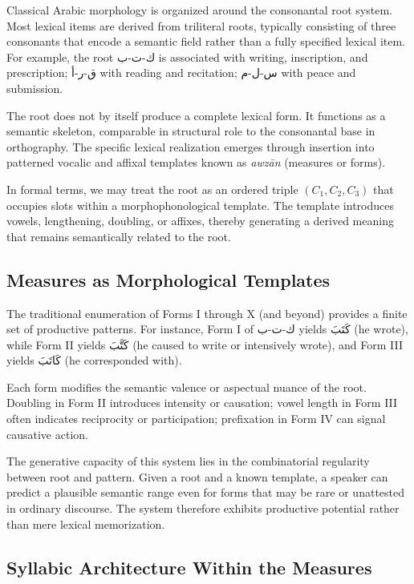 \documentclass[11pt]{article}
\begin{document}
Classical Arabic morphology is organized around the consonantal root system. Most lexical items are derived from triliteral roots, typically consisting of three consonants that encode a semantic field rather than a fully specified lexical item. For example, the root \textarabic{ك-ت-ب} is associated with writing, inscription, and prescription; \textarabic{ق-ر-أ} with reading and recitation; \textarabic{س-ل-م} with peace and submission.

The root does not by itself produce a complete lexical form. It functions as a semantic skeleton, comparable in structural role to the consonantal base in orthography. The specific lexical realization emerges through insertion into patterned vocalic and affixal templates known as \textit{awzān} (measures or forms).

In formal terms, we may treat the root as an ordered triple $(C_1, C_2, C_3)$ that occupies slots within a morphophonological template. The template introduces vowels, lengthening, doubling, or affixes, thereby generating a derived meaning that remains semantically related to the root.

\subsection{Measures as Morphological Templates}

The traditional enumeration of Forms I through X (and beyond) provides a finite set of productive patterns. For instance, Form I of \textarabic{ك-ت-ب} yields \textarabic{كَتَبَ} (he wrote), while Form II yields \textarabic{كَتَّبَ} (he caused to write or intensively wrote), and Form III yields \textarabic{كَاتَبَ} (he corresponded with).

Each form modifies the semantic valence or aspectual nuance of the root. Doubling in Form II introduces intensity or causation; vowel length in Form III often indicates reciprocity or participation; prefixation in Form IV can signal causative action.

The generative capacity of this system lies in the combinatorial regularity between root and pattern. Given a root and a known template, a speaker can predict a plausible semantic range even for forms that may be rare or unattested in ordinary discourse. The system therefore exhibits productive potential rather than mere lexical memorization.

\subsection{Syllabic Architecture Within the Measures}
\end{document}
